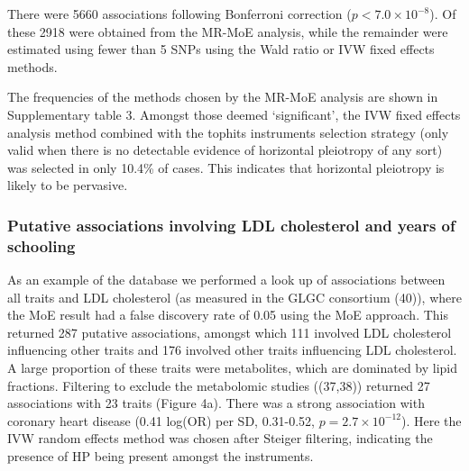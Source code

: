 \documentclass[]{article}
\begin{document}
There were 5660 associations following Bonferroni correction
(\(p < 7.0 \times 10^{-8}\)). Of these 2918 were obtained from the
MR-MoE analysis, while the remainder were estimated using fewer than 5
SNPs using the Wald ratio or IVW fixed effects methods.

The frequencies of the methods chosen by the MR-MoE analysis are shown
in Supplementary table 3. Amongst those deemed `significant', the IVW
fixed effects analysis method combined with the tophits instruments
selection strategy (only valid when there is no detectable evidence of
horizontal pleiotropy of any sort) was selected in only 10.4\% of cases.
This indicates that horizontal pleiotropy is likely to be pervasive.

\subsubsection{Putative associations involving LDL cholesterol and years
of
schooling}\label{putative-associations-involving-ldl-cholesterol-and-years-of-schooling}

As an example of the database we performed a look up of associations
between all traits and LDL cholesterol (as measured in the GLGC
consortium (40)), where the MoE result had a false discovery rate of
0.05 using the MoE approach. This returned 287 putative associations,
amongst which 111 involved LDL cholesterol influencing other traits and
176 involved other traits influencing LDL cholesterol. A large
proportion of these traits were metabolites, which are dominated by
lipid fractions. Filtering to exclude the metabolomic studies ((37,38))
returned 27 associations with 23 traits (Figure 4a). There was a strong
association with coronary heart disease (0.41 log(OR) per SD, 0.31-0.52,
\(p=2.7\times10^{-12}\)). Here the IVW random effects method was chosen
after Steiger filtering, indicating the presence of HP being present
amongst the instruments.
\end{document}
